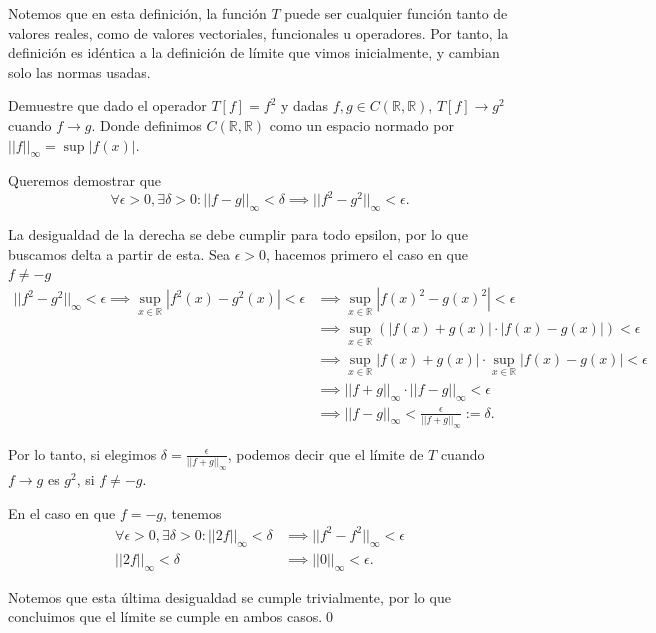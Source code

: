 \documentclass[12pt]{book}
\begin{document}
Notemos que en esta definición, la función $T$ puede ser cualquier función tanto de valores reales, como de valores vectoriales, funcionales u operadores. Por tanto, la definición es idéntica a la definición de límite que vimos inicialmente, y cambian solo las normas usadas. 

\begin{exampleenv}

Demuestre que dado el operador $T[f]=f^2$ y dadas $f, g\in C(\mathbb{R},\mathbb{R})$, $T[f]\to g^2$ cuando $f\to g$. Donde definimos $C(\mathbb{R},\mathbb{R})$ como un espacio normado por $||f||_\infty =\sup |f(x)|$.

Queremos demostrar que 
\[
    \forall \epsilon>0,\exists\delta>0:||f-g||_\infty <\delta\implies ||f^2-g^2||_\infty <\epsilon.
\]

La desigualdad de la derecha se debe cumplir para todo epsilon, por lo que buscamos delta a partir de esta. Sea $\epsilon >0$, hacemos primero el caso en que $f\neq-g$
\begin{align*}
    ||f^2-g^2||_\infty <\epsilon \implies \sup_{x\in \mathbb{R}}|f^2(x)-g^2(x)|<\epsilon &\implies \sup_{x\in \mathbb{R}}|f(x)^2-g(x)^2|<\epsilon\\
    &\implies\sup_{x\in \mathbb{R}}(|f(x)+g(x)|\cdot|f(x)-g(x)|)<\epsilon\\
    &\implies \sup_{x\in \mathbb{R}}|f(x)+g(x)|\cdot \sup_{x\in\mathbb{R}}|f(x)-g(x)|<\epsilon\\
    &\implies ||f+g||_\infty \cdot ||f-g||_\infty <\epsilon\\
    &\implies ||f-g||_\infty <\frac{\epsilon}{||f+g||_\infty}:=\delta.
\end{align*}

Por lo tanto, si elegimos $\delta = \frac{\epsilon}{||f+g||_\infty}$, podemos decir que el límite de $T$ cuando $f\to g$ es $g^2$, si $f\neq-g$.

En el caso en que $f=-g$, tenemos
\begin{align*}
    \forall \epsilon>0,\exists\delta>0:||2f||_\infty <\delta&\implies ||f^2-f^2||_\infty <\epsilon\\
    ||2f||_\infty <\delta &\implies ||0||_\infty<\epsilon.
\end{align*}

Notemos que esta última desigualdad se cumple trivialmente, por lo que concluimos que el límite se cumple en ambos casos.\qed\\
\end{exampleenv}
\end{document}
